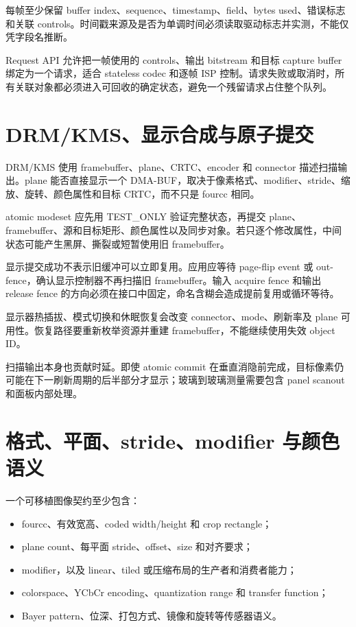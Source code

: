 每帧至少保留 buffer index、sequence、timestamp、field、bytes used、错误标志和关联 controls。时间戳来源及是否为单调时间必须读取驱动标志并实测，不能仅凭字段名推断。

Request API 允许把一帧使用的 controls、输出 bitstream 和目标 capture buffer 绑定为一个请求，适合 stateless codec 和逐帧 ISP 控制。请求失败或取消时，所有关联对象都必须进入可回收的确定状态，避免一个残留请求占住整个队列。

\section{DRM/KMS、显示合成与原子提交}

DRM/KMS 使用 framebuffer、plane、CRTC、encoder 和 connector 描述扫描输出。plane 能否直接显示一个 DMA-BUF，取决于像素格式、modifier、stride、缩放、旋转、颜色属性和目标 CRTC，而不只是 fourcc 相同\cite{linux-drm-api}。

atomic modeset 应先用 TEST\_ONLY 验证完整状态，再提交 plane、framebuffer、源和目标矩形、颜色属性以及同步对象。若只逐个修改属性，中间状态可能产生黑屏、撕裂或短暂使用旧 framebuffer。

显示提交成功不表示旧缓冲可以立即复用。应用应等待 page-flip event 或 out-fence，确认显示控制器不再扫描旧 framebuffer。输入 acquire fence 和输出 release fence 的方向必须在接口中固定，命名含糊会造成提前复用或循环等待。

显示器热插拔、模式切换和休眠恢复会改变 connector、mode、刷新率及 plane 可用性。恢复路径要重新枚举资源并重建 framebuffer，不能继续使用失效 object ID。

扫描输出本身也贡献时延。即使 atomic commit 在垂直消隐前完成，目标像素仍可能在下一刷新周期的后半部分才显示；玻璃到玻璃测量需要包含 panel scanout 和面板内部处理。

\section{格式、平面、stride、modifier 与颜色语义}

一个可移植图像契约至少包含：

\begin{itemize}
  \item fourcc、有效宽高、coded width/height 和 crop rectangle；
  \item plane count、每平面 stride、offset、size 和对齐要求；
  \item modifier，以及 linear、tiled 或压缩布局的生产者和消费者能力；
  \item colorspace、YCbCr encoding、quantization range 和 transfer function；
  \item Bayer pattern、位深、打包方式、镜像和旋转等传感器语义。
\end{itemize}

